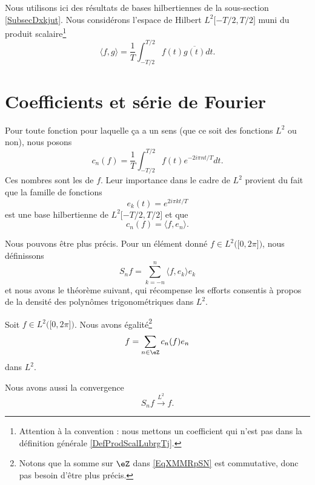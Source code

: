 Nous utilisons ici des résultats de bases hilbertiennes de la sous-section \ref{SubsecDxkjut}. Nous considérons l'espace de Hilbert \( L^2\mathopen[ -T/2 , T/2 \mathclose]\) muni du produit scalaire\footnote{Attention à la convention : nous mettons un coefficient qui n'est pas dans la définition générale \eqref{DefProdScalLubrgTj}.}
\begin{equation}    \label{EqQBcpyyJ}
    \langle f, g\rangle =\frac{1}{ T }\int_{-T/2}^{T/2}f(t)\overline{ g(t) }dt.
\end{equation}

\section{Coefficients et série de Fourier}
\label{SecXAYasNI}

Pour toute fonction pour laquelle ça a un sens (que ce soit des fonctions \( L^2\) ou non), nous posons
\begin{equation}\label{EqhIPoPH}
    c_n(f)=\frac{1}{ T }\int_{-T/2}^{T/2}f(t) e^{-2i\pi nt/T}dt.
\end{equation}
Ces nombres sont les  de \( f\). Leur importance dans le cadre de \( L^2\) provient du fait que la famille de fonctions
\begin{equation}
    e_k(t)=  e^{2i\pi kt/T}
\end{equation}
est une base hilbertienne de \( L^2\mathopen[ -T/2 , T/2 \mathclose]\) et que
\begin{equation}
    c_n(f)=\langle f, e_n\rangle .
\end{equation}

Nous pouvons être plus précis. Pour un élément donné \( f\in L^2\big( \mathopen[ 0 , 2\pi \mathclose] \big)\), nous définissons 
\begin{equation}
    S_nf=\sum_{k=-n}^n\langle f, e_k\rangle e_k
\end{equation}
et nous avons le théorème suivant, qui récompense les efforts consentis à propos de la densité des polynômes trigonométriques dans \( L^2\).

\begin{theorem} \label{ThoYDKZLyv}
    Soit \( f\in L^2\big( \mathopen[ 0 , 2\pi \mathclose] \big)\). Nous avons égalité\footnote{Notons que la somme sur \( \eZ\) dans \eqref{EqXMMRpSN} est commutative, donc pas besoin d'être plus précis.}
    \begin{equation}    \label{EqXMMRpSN}
        f=\sum_{n\in \eZ}c_n(f)e_n
    \end{equation}
    dans \( L^2\).

    Nous avons aussi la convergence
\begin{equation}    \label{EqRBWKsYP}
    S_nf\stackrel{L^2}{\to} f.
\end{equation}
\end{theorem}

